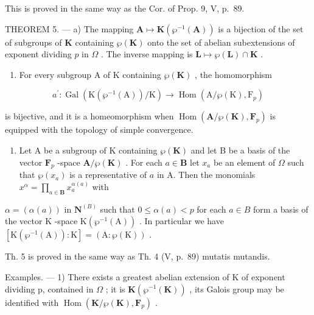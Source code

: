 This is proved in the same way as the Cor. of Prop. 9, V, p.~89.

THEOREM 5. --- a) The mapping \(\mathbf{A} \mapsto \mathbf{K}(\wp^{-1}(\mathbf{A}))\) is a bijection of the set of subgroups of \(\mathbf{K}\) containing \(\wp(\mathbf{K})\) onto the set of abelian subextensions of exponent dividing \(p\) in \(\Omega\) . The inverse mapping is \(\mathbf{L} \mapsto \wp(\mathbf{L}) \cap \mathbf{K}\) .

\begin{enumerate}
\def\labelenumi{\alph{enumi})}
\setcounter{enumi}{1}
\tightlist
\item
  For every subgroup A of K containing \(\wp(\mathbf{K})\) , the homomorphism
\end{enumerate}

\[
a ^ {\prime}: \operatorname{Gal} \left(\mathrm{K} \left(\wp^ {- 1} (\mathrm{A})\right) / \mathrm{K}\right)\rightarrow \operatorname{Hom} \left(\mathrm{A} / \wp (\mathrm{K}), \mathrm{F} _ {p}\right)
\]

is bijective, and it is a homeomorphism when \(\operatorname{Hom}(\mathbf{A}/\wp(\mathbf{K}), \mathbf{F}_p)\) is equipped with the topology of simple convergence.

\begin{enumerate}
\def\labelenumi{\alph{enumi})}
\setcounter{enumi}{2}
\tightlist
\item
  Let A be a subgroup of K containing \(\wp(\mathbf{K})\) and let B be a basis of the vector \(\mathbf{F}_{p}\) -space \(\mathbf{A}/\wp(\mathbf{K})\) . For each \(a \in \mathbf{B}\) let \(x_{a}\) be an element of \(\Omega\) such that \(\wp(x_{a})\) is a representative of \(a\) in A. Then the monomials \(x^{\alpha} = \prod_{a \in \mathbf{B}} x_{a}^{\alpha(a)}\) with
\end{enumerate}

\(\alpha = (\alpha(a))\) in \(\mathbf{N}^{(B)}\) such that \(0 \leqslant \alpha(a) < p\) for each \(a \in B\) form a basis of the vector \(\mathrm{K}\) -space \(\mathrm{K}(\wp^{-1}(\mathrm{A}))\) . In particular we have \([\mathrm{K}(\wp^{-1}(\mathrm{A})): \mathrm{K}] = (\mathrm{A}: \wp(\mathrm{K}))\) .

Th. 5 is proved in the same way as Th. 4 (V, p.~89) mutatis mutandis.

Examples. --- 1) There exists a greatest abelian extension of K of exponent dividing p, contained in \(\Omega\) ; it is \(\mathbf{K}(\wp^{-1}(\mathbf{K}))\) , its Galois group may be identified with \(\operatorname{Hom}(\mathbf{K}/\wp(\mathbf{K}), \mathbf{F}_{p})\) .

